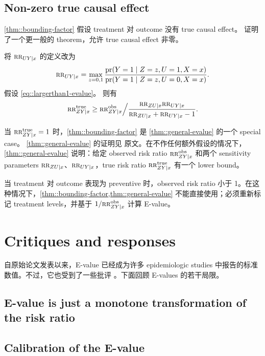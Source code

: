 \subsection{Non-zero true causal effect}
 
\cref{thm::bounding-factor} 假设 treatment 对 outcome 没有 true causal effect。\citet{ding2016sensitivity} 证明了一个更一般的 theorem，允许 true causal effect 非零。


\begin{theorem}
\label{thm::general-evalue}
将 $\textsc{rr}_{UY\mid x}   $ 的定义改为
$$
 \textsc{rr}_{UY\mid x}  =  \max_{z=0,1} \frac{  \textup{pr}(Y=1\mid Z=z, U=1, X=x) }{  \textup{pr}(Y=1\mid Z=z, U=0, X=x) }.
$$
假设 \eqref{eq::largerthan1-evalue}。
则有
$$
\textsc{rr}_{ZY\mid x}^{\textup{true}} \geq 
\textsc{rr}_{ZY\mid x}^{\textup{obs}} \Big /  \frac{ \textsc{rr}_{ZU\mid x}  \textsc{rr}_{UY\mid x} }{  \textsc{rr}_{ZU\mid x} + \textsc{rr}_{UY\mid x} - 1} .
$$
\end{theorem}

当 $\textsc{rr}_{ZY\mid x}^{\textup{true}}   = 1$ 时，\cref{thm::bounding-factor} 是 \cref{thm::general-evalue} 的一个 special case。
\cref{thm::general-evalue} 的证明见 \citet{ding2016sensitivity} 原文。在不作任何额外假设的情况下，\cref{thm::general-evalue} 说明：给定 observed risk ratio $\textsc{rr}_{ZY\mid x}^{\textup{obs}}$ 和两个 sensitivity parameters $\textsc{rr}_{ZU\mid x} $、$ \textsc{rr}_{UY\mid x}$，true risk ratio $\textsc{rr}_{ZY\mid x}^{\textup{true}}$ 有一个 lower bound。


当 treatment 对 outcome 表现为 preventive 时，observed risk ratio 小于 1。在这种情况下，\cref{thm::bounding-factor,thm::general-evalue} 不能直接使用；必须重新标记 treatment levels，并基于 $1/ \textsc{rr}_{ZY\mid x}^{\textup{obs}}$ 计算 E-value。




\section{Critiques and responses}

自原始论文发表以来，E-value 已经成为许多 epidemiologic studies 中报告的标准数值。不过，它也受到了一些批评 \citep{ioannidis2019limitations}。下面回顾 E-values 的若干局限。



\subsection{E-value is just a monotone transformation of the risk ratio}
\label{sec::evalue-monotone}



\subsection{Calibration of the E-value}




